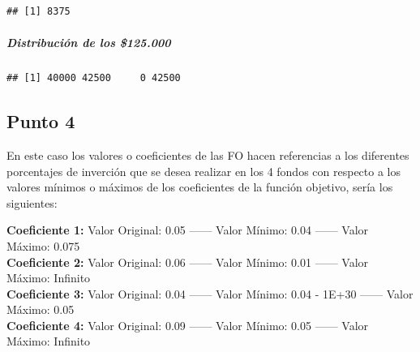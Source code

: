 \documentclass[
]{article}
\newenvironment{Shaded}{\begin{snugshade}}{\end{snugshade}}
\newcommand{\CommentTok}[1]{\textcolor[rgb]{0.56,0.35,0.01}{\textit{#1}}}
\newcommand{\NormalTok}[1]{#1}
\newcommand{\OperatorTok}[1]{\textcolor[rgb]{0.81,0.36,0.00}{\textbf{#1}}}
\begin{document}
\begin{Shaded}
\end{Shaded}

\begin{verbatim}
## [1] 8375
\end{verbatim}

\begin{Shaded}
\end{Shaded}

\hypertarget{distribuciuxf3n-de-los-125.000}{%
\subparagraph{Distribución de los
\$125.000}\label{distribuciuxf3n-de-los-125.000}}

\begin{Shaded}
\end{Shaded}

\begin{verbatim}
## [1] 40000 42500     0 42500
\end{verbatim}

\begin{Shaded}
\end{Shaded}

\hypertarget{punto-4}{%
\subsection{Punto 4}\label{punto-4}}

En este caso los valores o coeficientes de las FO hacen referencias a
los diferentes porcentajes de inverción que se desea realizar en los 4
fondos con respecto a los valores mínimos o máximos de los coeficientes
de la función objetivo, sería los siguientes:

\textbf{Coeficiente 1:} Valor Original: 0.05 ------ Valor Mínimo: 0.04
------ Valor Máximo: 0.075\\
\textbf{Coeficiente 2:} Valor Original: 0.06 ------ Valor Mínimo: 0.01
------ Valor Máximo: Infinito\\
\textbf{Coeficiente 3:} Valor Original: 0.04 ------ Valor Mínimo: 0.04 -
1E+30 ------ Valor Máximo: 0.05\\
\textbf{Coeficiente 4:} Valor Original: 0.09 ------ Valor Mínimo: 0.05
------ Valor Máximo: Infinito
\end{document}
